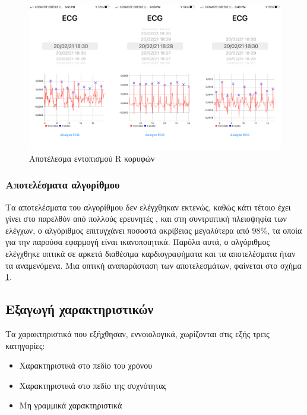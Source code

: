 \begin{figure}[h]
    \centering
    \includegraphics[scale=0.17]{latex_code/Figures_new/ecg_full.png}
    \caption{Αποτέλεσμα εντοπισμού R κορυφών}
    \label{fig:ecg_easy}
\end{figure}


\subsubsection{Αποτελέσματα αλγορίθμου}

Τα αποτελέσματα του αλγορίθμου δεν ελέγχθηκαν εκτενώς, καθώς κάτι τέτοιο έχει γίνει στο παρελθόν από πολλούς ερευνητές \cite{Fariha_2020} \cite{pan_tompkins_matlab}, και στη συντριπτική πλειοψηφία των ελέγχων, ο αλγόριθμος επιτυγχάνει ποσοστά ακρίβειας μεγαλύτερα από 98\%, τα οποία για την παρούσα εφαρμογή είναι ικανοποιητικά. Παρόλα αυτά, ο αλγόριθμος ελέγχθηκε οπτικά σε αρκετά διαθέσιμα καρδιογραφήματα και τα αποτελέσματα ήταν τα αναμενόμενα. Μια οπτική αναπαράσταση των αποτελεσμάτων, φαίνεται στο σχήμα \ref{fig:ecg_easy}.



\subsection{Εξαγωγή χαρακτηριστικών}

Τα χαρακτηριστικά που εξήχθησαν, εννοιολογικά, χωρίζονται στις εξής τρεις κατηγορίες:
\begin{itemize}
    \item Χαρακτηριστικά στο πεδίο του χρόνου
    \item Χαρακτηριστικά στο πεδίο της συχνότητας
    \item Μη γραμμικά χαρακτηριστικά
\end{itemize}

